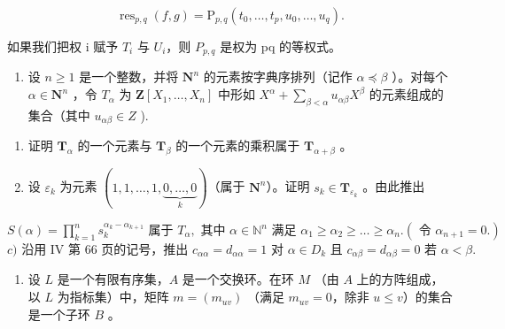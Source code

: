 \[
\operatorname{res} _ {p, q} (f, g) = \mathrm{P} _ {p, q} \left(t _ {0}, \dots , t _ {p}, u _ {0}, \dots , u _ {q}\right).
\]

如果我们把权 i 赋予 \(T_{i}\) 与 \(U_{i}\)，则 \(P_{p,q}\) 是权为 pq 的等权式。

\begin{enumerate}
\def\labelenumi{\arabic{enumi})}
\setcounter{enumi}{12}
\tightlist
\item
  设 \(n \geqslant 1\) 是一个整数，并将 \(\mathbf{N}^n\) 的元素按字典序排列（记作 \(\alpha \preccurlyeq \beta\) ）。对每个 \(\alpha \in \mathbf{N}^n\) ，令 \(T_{\alpha}\) 为 \(\mathbf{Z}[X_1, \ldots, X_n]\) 中形如 \(X^{\alpha} + \sum_{\beta < \alpha} u_{\alpha\beta} X^{\beta}\) 的元素组成的集合（其中 \(u_{\alpha\beta} \in Z\) ).
\end{enumerate}

\begin{enumerate}
\def\labelenumi{\alph{enumi})}
\tightlist
\item
  证明 \(\mathbf{T}_{\alpha}\) 的一个元素与 \(\mathbf{T}_{\beta}\) 的一个元素的乘积属于 \(\mathbf{T}_{\alpha + \beta}\) 。\\
\item
  设 \(\varepsilon_{k}\) 为元素 \((1, 1, \ldots, 1, \underbrace{0, \ldots, 0}_{k})\)（属于 \(\mathbf{N}^{n}\)）。证明 \(s_{k} \in \mathbf{T}_{\varepsilon_{k}}\) 。由此推出
\end{enumerate}

\(S(\alpha) = \prod_{k=1}^{n} s_k^{\alpha_k - \alpha_{k+1}} \text{ 属于 } T_\alpha, \text{ 其中 } \alpha \in \mathbb{N}^n \text{ 满足 } \alpha_1 \geqslant \alpha_2 \geqslant \ldots \geqslant \alpha_n. (\text{ 令 } \alpha_{n+1} = 0.)\) \(c) \text{ 沿用 IV 第 66 页的记号，推出 } c_{\alpha\alpha} = d_{\alpha\alpha} = 1 \text{ 对 } \alpha \in D_k \text{ 且 } c_{\alpha\beta} = d_{\alpha\beta} = 0 \text{ 若 } \alpha < \beta.\)

\begin{enumerate}
\def\labelenumi{\arabic{enumi})}
\setcounter{enumi}{13}
\tightlist
\item
  设 \(L\) 是一个有限有序集，\(A\) 是一个交换环。在环 \(M\) （由 \(A\) 上的方阵组成，以 \(L\) 为指标集）中，矩阵 \(m = (m_{uv})\) （满足 \(m_{uv} = 0\)，除非 \(u \leqslant v\)）的集合是一个子环 \(B\) 。
\end{enumerate}

